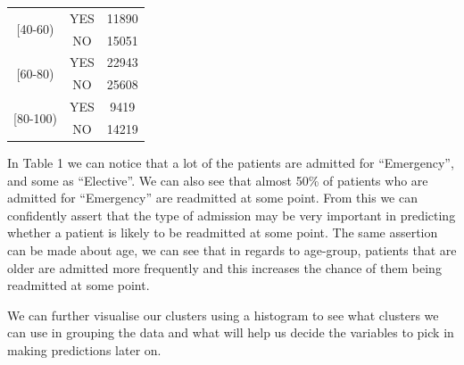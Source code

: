 \documentclass[11pt]{report}
\newcommand{\linespace}{\vspace{0.3cm}\noindent}
\begin{document}
\begin{table}[!ht]
\begin{minipage}[t]{.5\linewidth}
\begin{tabular}{|c|c|c|}
\multirow{2}{*}{[40-60)}       & YES & 11890     \\
                               & NO  & 15051    \\ \hline
\multirow{2}{*}{[60-80)}       & YES & 22943  \\
                               & NO  & 25608  \\ \hline
\multirow{2}{*}{[80-100)}       & YES & 9419  \\
                               & NO  & 14219  \\ \hline
\end{tabular}
    \end{minipage} 
\end{table}

\noindent
In Table 1 we can notice that a lot of the patients are admitted for ``Emergency'', and some as ``Elective''. We can also see that almost 50\% of patients who are admitted for ``Emergency'' are readmitted at some point. From this we can confidently assert that the type of admission may be very important in predicting whether a patient is likely to be readmitted at some point. The same assertion can be made about age, we can see that in regards to age-group, patients that are older are admitted more frequently and this increases the chance of them being readmitted at some point.

\linespace
We can further visualise our clusters using a histogram to see what clusters we can use in grouping the data and what will help us decide the variables to pick in making predictions later on.
\end{document}
